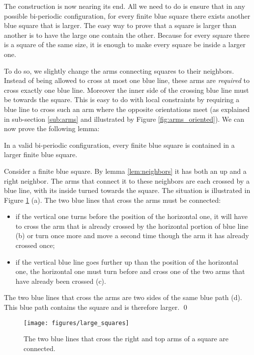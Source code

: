 \documentclass{jac}
\begin{document}
The construction is now nearing its end. All we need to do is ensure that in any possible bi-periodic configuration, for every finite blue square there exists another blue square that is larger. The easy way to prove that a square is larger than another is to have the large one contain the other. Because for every square there is a  square of the same size, it is enough to make every  square be inside a larger one.

To do so, we slightly change the arms connecting  squares to their neighbors. Instead of being allowed to cross at most one blue line, these arms are \emph{required} to cross exactly one blue line. Moreover the inner side of the crossing blue line must be towards the  square. This is easy to do with local constraints by requiring a blue line to cross such an arm where the opposite orientations meet (as explained in sub-section \ref{sub:arms} and illustrated by Figure \ref{fig:arms_oriented}). We can now prove the following lemma:

\begin{lemma}\label{lem:large_squares}
    In a valid bi-periodic configuration, every finite  blue square is contained in a larger finite blue square.
\end{lemma}
\proof
Consider a finite  blue square. By lemma \ref{lem:neighbors} it has both an up and a right neighbor. The arms that connect it to these neighbors are each crossed by a blue line, with its inside turned towards the  square. The situation is illustrated in Figure \ref{fig:large_squares} (a). The two blue lines that cross the arms must be connected:
\begin{itemize}
    \item if the vertical one turns before the position of the horizontal one, it will have to cross the arm that is already crossed by the horizontal portion of blue line (b) or turn once more and move a second time though the arm it has already crossed once;
    \item if the vertical blue line goes further up than the position of the horizontal one, the horizontal one must turn before and cross one of the two arms that have already been crossed (c).
\end{itemize}
The two blue lines that cross the arms are two sides of the same blue path (d). This blue path contains the  square and is therefore larger.
\qed
\begin{figure}[htbp]
    \centering
        \texttt{[image: figures/large\_squares]}
    \caption{The two blue lines that cross the right and top arms of a  square are connected.}
    \label{fig:large_squares}
\end{figure}
\end{document}
